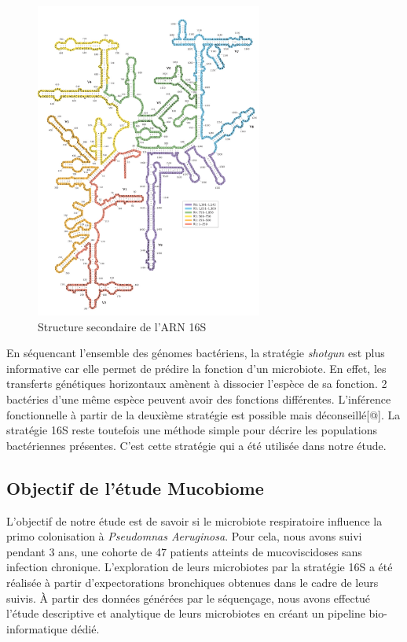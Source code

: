 \documentclass[12pt,a4paper]{article}
\begin{document}
\begin{figure}[ht]
\begin{center}
\includegraphics[scale=0.8]{img/ARN_16S.png}\hfill
\end{center}
\caption{Structure secondaire de l'ARN 16S}
\label{ARN16S}
\end{figure}


En séquencant l'ensemble des génomes bactériens, la stratégie \textit{shotgun} est plus informative car elle permet de prédire la fonction d'un microbiote. En effet, les transferts génétiques horizontaux amènent à dissocier l'espèce de sa fonction. 2 bactéries d'une même espèce peuvent avoir des fonctions différentes. L'inférence fonctionnelle à partir de la deuxième stratégie est possible mais déconseillé[@].  
La stratégie 16S reste toutefois une méthode simple pour décrire les populations bactériennes présentes. C'est cette stratégie qui a été utilisée dans notre étude. 



\subsection{Objectif de l'étude Mucobiome}
L'objectif de notre étude est de savoir si le microbiote respiratoire influence la primo colonisation à \textit{Pseudomnas Aeruginosa}. 
Pour cela, nous avons suivi pendant 3 ans,  une cohorte de 47 patients atteints de mucoviscidoses sans infection chronique. 
L'exploration de leurs microbiotes par la stratégie 16S a été réalisée à partir d'expectorations bronchiques obtenues dans le cadre de leurs suivis. 
À partir des données générées par le séquençage, nous avons effectué l'étude descriptive et analytique de leurs microbiotes en créant un pipeline bio-informatique dédié. 
\end{document}

